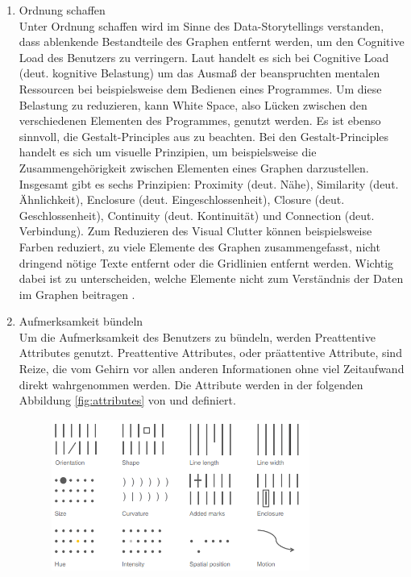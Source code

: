 \begin{enumerate}
\begin{multicols}{2}
    \end{multicols}
    Unter \cite{SeverinoRibecca.} werden viele Charttypen aufgelistet, die vereinfacht dargestellt sind und auch nach Funktion gefiltert werden können. Das kann bei der Auswahl des passenden Charttyps helfen.\\
    \item Ordnung schaffen\hfill\\ Unter Ordnung schaffen wird im Sinne des Data-Storytellings verstanden, dass ablenkende Bestandteile des Graphen entfernt werden, um den \glqq Cognitive Load\grqq{} des Benutzers zu verringern. Laut \cite{Plass.2010} handelt es sich bei Cognitive Load (deut. kognitive Belastung) um das Ausmaß der beanspruchten mentalen Ressourcen bei beispielsweise dem Bedienen eines Programmes. Um diese Belastung zu reduzieren, kann White Space, also Lücken zwischen den verschiedenen Elementen des Programmes, genutzt werden. Es ist ebenso sinnvoll, die Gestalt-Principles aus \cite{Schwabish.2021} zu beachten. Bei den Gestalt-Principles handelt es sich um visuelle Prinzipien, um beispielsweise die  Zusammengehörigkeit zwischen Elementen eines Graphen darzustellen. Insgesamt gibt es sechs Prinzipien: Proximity (deut. Nähe), Similarity (deut. Ähnlichkeit), Enclosure (deut. Eingeschlossenheit), Closure (deut. Geschlossenheit), Continuity (deut. Kontinuität) und Connection (deut. Verbindung). Zum Reduzieren des Visual Clutter können beispielsweise Farben reduziert, zu viele Elemente des Graphen zusammengefasst, nicht dringend nötige Texte entfernt oder die Gridlinien entfernt werden. Wichtig dabei ist zu unterscheiden, welche Elemente nicht zum Verständnis der Daten im Graphen beitragen \cite{TalksatGoogle.2015}.\\
    \item Aufmerksamkeit bündeln\hfill\\ Um die Aufmerksamkeit des Benutzers zu bündeln, werden \glqq Preattentive Attributes\grqq{} genutzt. Preattentive Attributes, oder präattentive Attribute, sind Reize, die vom Gehirn vor allen anderen Informationen ohne viel Zeitaufwand direkt wahrgenommen werden. Die Attribute werden in der folgenden Abbildung \ref{fig:attributes} von \cite{Knaflic.2016} und \cite{Few.2004} definiert.
    \begin{figure}[h!]
    \centering
    \includegraphics[width=0.8\textwidth]{gfx/preattentive attributes.png}

\end{figure}
\end{enumerate}
